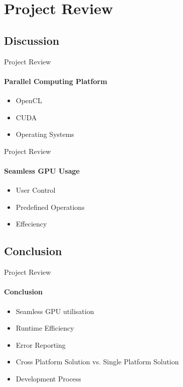 \section{Project Review}

	\subsection{Discussion}
	\begin{frame}[t]{Project Review}\framesubtitle{Parallel Computing Platform}
		\begin{itemize}
			\item OpenCL
			\item CUDA
			\item Operating Systems
		\end{itemize}
	\end{frame}

	\begin{frame}[t]{Project Review}\framesubtitle{Seamless GPU Usage}
		\begin{itemize}
			\item User Control
			\item Predefined Operations
			\item Effeciency
		\end{itemize}
	\end{frame}

	\subsection{Conclusion}
	\begin{frame}[t]{Project Review}\framesubtitle{Conclusion}
		\begin{itemize}
			\item Seamless GPU utilisation
			\item Runtime Efficiency
			\item Error Reporting
			\item Cross Platform Solution vs. Single Platform Solution 
			\item Development Process
		\end{itemize}
	\end{frame}

